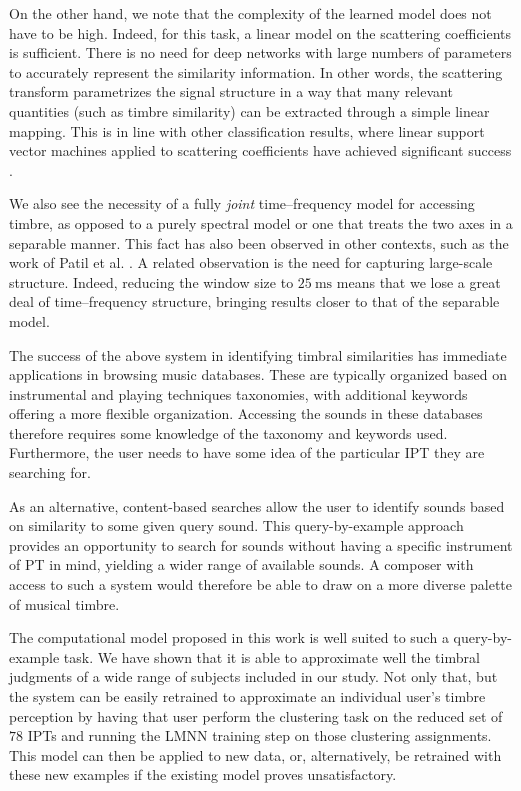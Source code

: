 \documentclass{bmcart}
\begin{document}
On the other hand, we note that the complexity of the learned model does not have to be high.
Indeed, for this task, a linear model on the scattering coefficients is sufficient.
There is no need for deep networks with large numbers of parameters to accurately represent the similarity information.
In other words, the scattering transform parametrizes the signal structure in a way that many relevant quantities (such as timbre similarity) can be extracted through a simple linear mapping.
This is in line with other classification results, where linear support vector machines applied to scattering coefficients have achieved significant success \cite{anden2015mlsp,anden2019tsp}.

We also see the necessity of a fully \emph{joint} time--frequency model for accessing timbre, as opposed to a purely spectral model or one that treats the two axes in a separable manner.
This fact has also been observed in other contexts, such as the work of Patil et al. \cite{patil2012ploscompbiol}.
A related observation is the need for capturing large-scale structure.
Indeed, reducing the window size to $25~\mathrm{ms}$ means that we lose a great deal of time--frequency structure, bringing results closer to that of the separable model.

The success of the above system in identifying timbral similarities has immediate applications in browsing music databases.
These are typically organized based on instrumental and playing techniques taxonomies, with additional keywords offering a more flexible organization.
Accessing the sounds in these databases therefore requires some knowledge of the taxonomy and keywords used.
Furthermore, the user needs to have some idea of the particular IPT they are searching for.

As an alternative, content-based searches allow the user to identify sounds based on similarity to some given query sound.
This query-by-example approach provides an opportunity to search for sounds without having a specific instrument of PT in mind, yielding a wider range of available sounds.
A composer with access to such a system would therefore be able to draw on a more diverse palette of musical timbre.

The computational model proposed in this work is well suited to such a query-by-example task.
We have shown that it is able to approximate well the timbral judgments of a wide range of subjects included in our study.
Not only that, but the system can be easily retrained to approximate an individual user's timbre perception by having that user perform the clustering task on the reduced set of $78$ IPTs and running the LMNN training step on those clustering assignments.
This model can then be applied to new data, or, alternatively, be retrained with these new examples if the existing model proves unsatisfactory.
\end{document}
